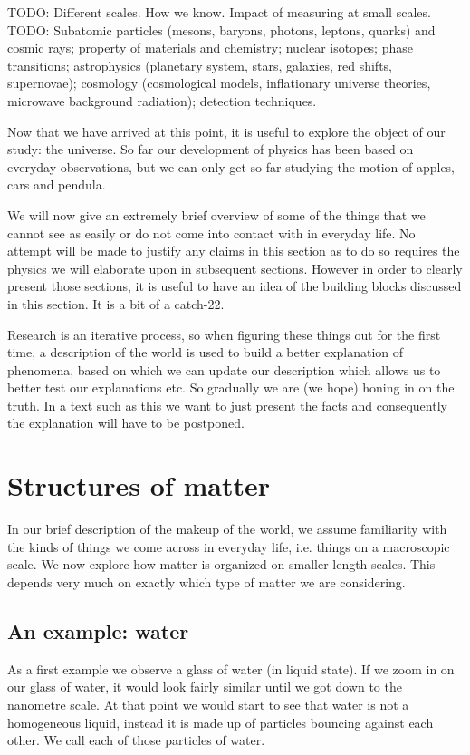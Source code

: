 TODO: Different scales. How we know. Impact of measuring at small scales.
TODO:
Subatomic particles (mesons, baryons, photons, leptons, quarks) and cosmic rays; property of materials and chemistry; nuclear isotopes; phase transitions; astrophysics (planetary system, stars, galaxies, red shifts, supernovae); cosmology (cosmological models, inflationary universe theories, microwave background radiation); detection techniques.


Now that we have arrived at this point, it is useful to explore the object of our study: the universe. So far our development of physics has been based on everyday observations, but we can only get so far studying the motion of apples, cars and pendula.

We will now give an extremely brief overview of some of the things that we cannot see as easily or do not come into contact with in everyday life. No attempt will be made to justify any claims in this section as to do so requires the physics we will elaborate upon in subsequent sections. However in order to clearly present those sections, it is useful to have an idea of the building blocks discussed in this section. It is a bit of a catch-22.

Research is an iterative process, so when figuring these things out for the first time, a description of the world is used to build a better explanation of phenomena, based on which we can update our description which allows us to better test our explanations etc. So gradually we are (we hope) honing in on the truth. In a text such as this we want to just present the facts and consequently the explanation will have to be postponed.

\chapter{Structures of matter}
In our brief description of the makeup of the world, we assume familiarity with the kinds of things we come across in everyday life, i.e. things on a macroscopic scale. We now explore how matter is organized on smaller length scales. This depends very much on exactly which type of matter we are considering. 

\section{An example: water}
As a first example we observe a glass of water (in liquid state).
If we zoom in on our glass of water, it would look fairly similar until we got down to the nanometre scale. At that point we would start to see that water is not a homogeneous liquid, instead it is made up of particles bouncing against each other. We call each of those particles  of water.

